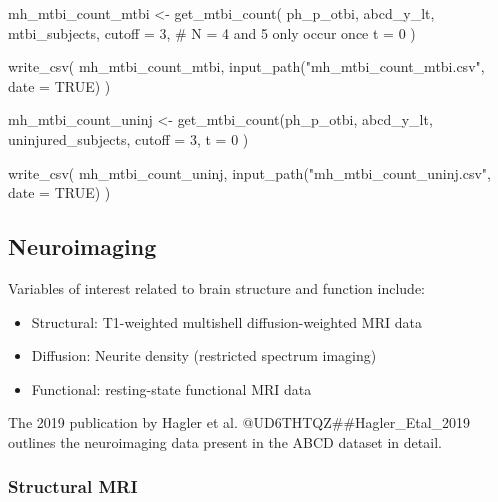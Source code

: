 \documentclass[
  letterpaper,
  DIV=11,
  numbers=noendperiod]{scrreprt}
\newenvironment{Shaded}{\begin{snugshade}}{\end{snugshade}}
\newcommand{\AttributeTok}[1]{\textcolor[rgb]{0.40,0.45,0.13}{#1}}
\newcommand{\CommentTok}[1]{\textcolor[rgb]{0.37,0.37,0.37}{#1}}
\newcommand{\ConstantTok}[1]{\textcolor[rgb]{0.56,0.35,0.01}{#1}}
\newcommand{\DecValTok}[1]{\textcolor[rgb]{0.68,0.00,0.00}{#1}}
\newcommand{\FunctionTok}[1]{\textcolor[rgb]{0.28,0.35,0.67}{#1}}
\newcommand{\NormalTok}[1]{\textcolor[rgb]{0.00,0.23,0.31}{#1}}
\newcommand{\OtherTok}[1]{\textcolor[rgb]{0.00,0.23,0.31}{#1}}
\newcommand{\StringTok}[1]{\textcolor[rgb]{0.13,0.47,0.30}{#1}}
\providecommand{\tightlist}{%
  \setlength{\itemsep}{0pt}\setlength{\parskip}{0pt}}\usepackage{longtable,booktabs,array}
\begin{document}
\begin{Shaded}
\begin{Highlighting}[]
\NormalTok{mh\_mtbi\_count\_mtbi }\OtherTok{\textless{}{-}} \FunctionTok{get\_mtbi\_count}\NormalTok{(}
\NormalTok{    ph\_p\_otbi,}
\NormalTok{    abcd\_y\_lt,}
\NormalTok{    mtbi\_subjects,}
    \AttributeTok{cutoff =} \DecValTok{3}\NormalTok{, }\CommentTok{\# N = 4 and 5 only occur once}
    \AttributeTok{t =} \DecValTok{0}
\NormalTok{)}

\FunctionTok{write\_csv}\NormalTok{(}
\NormalTok{    mh\_mtbi\_count\_mtbi, }\FunctionTok{input\_path}\NormalTok{(}\StringTok{"mh\_mtbi\_count\_mtbi.csv"}\NormalTok{, }\AttributeTok{date =} \ConstantTok{TRUE}\NormalTok{)}
\NormalTok{)}

\NormalTok{mh\_mtbi\_count\_uninj }\OtherTok{\textless{}{-}} \FunctionTok{get\_mtbi\_count}\NormalTok{(ph\_p\_otbi,}
\NormalTok{    abcd\_y\_lt,}
\NormalTok{    uninjured\_subjects,}
    \AttributeTok{cutoff =} \DecValTok{3}\NormalTok{,}
    \AttributeTok{t =} \DecValTok{0}
\NormalTok{)}

\FunctionTok{write\_csv}\NormalTok{(}
\NormalTok{    mh\_mtbi\_count\_uninj, }\FunctionTok{input\_path}\NormalTok{(}\StringTok{"mh\_mtbi\_count\_uninj.csv"}\NormalTok{, }\AttributeTok{date =} \ConstantTok{TRUE}\NormalTok{)}
\NormalTok{)}
\end{Highlighting}
\end{Shaded}

\subsection{Neuroimaging}\label{neuroimaging}

Variables of interest related to brain structure and function include:

\begin{itemize}
\tightlist
\item
  Structural: T1-weighted multishell diffusion-weighted MRI data
\item
  Diffusion: Neurite density (restricted spectrum imaging)
\item
  Functional: resting-state functional MRI data
\end{itemize}

The 2019 publication by Hagler et al. @UD6THTQZ\#\#Hagler\_Etal\_2019
outlines the neuroimaging data present in the ABCD dataset in detail.

\subsubsection{Structural MRI}\label{structural-mri}
\end{document}
